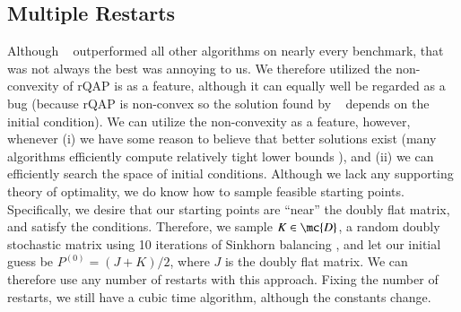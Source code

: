 \documentclass[preprint,11pt]{elsarticle}
\begin{document}





\subsection{Multiple Restarts} %
\label{sub:multiple_restarts}




Although \FAQ~ outperformed all other algorithms on nearly every benchmark, that \FAQ~ was not always the best was annoying to us.
% 
We therefore utilized the non-convexity of rQAP is as a feature, although it can equally well be regarded as a bug  (because rQAP is non-convex so the solution found by \FAQ~ depends on the initial condition).  We can utilize the non-convexity as a feature, however, whenever (i) we have some reason to believe that better solutions exist (many algorithms efficiently compute relatively tight lower bounds \cite{Anstreicher2009}), and (ii) we can efficiently search the space of initial conditions.  Although we lack any supporting theory of optimality, we do know how to sample feasible starting points.  Specifically, we desire that our starting points are ``near'' the doubly flat matrix, and satisfy the conditions.  Therefore, we  sample $K \in \mc{D}$, a random doubly stochastic matrix using 10 iterations of Sinkhorn balancing \cite{Sinkhorn1964}, and let our initial guess be $P^{(0)}=(J+K)/2$, where $J$ is the doubly flat matrix.  We can therefore use any number of restarts with this approach.  Fixing the number of restarts, we still have a cubic time algorithm, although the constants change.  
\end{document}
